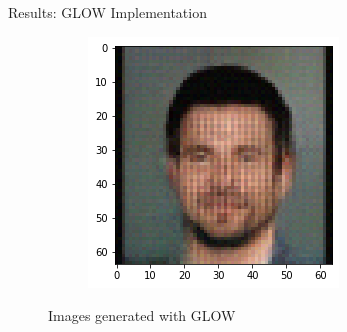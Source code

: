 \begin{frame}{Results: GLOW Implementation}
\begin{figure}[htbp!]
\begin{subfigure}[b]{0.3\textwidth}
     \end{subfigure}
     \hfill
     \begin{subfigure}[b]{0.3\textwidth}
         \centering
         \includegraphics[width=\textwidth]{Images/celeb_sample3.png}
     \end{subfigure}
     \hfill
     \caption{Images generated with GLOW}
\end{figure}
\end{frame}
